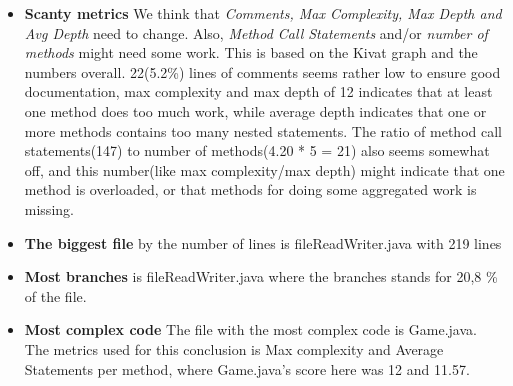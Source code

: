 \documentclass{article}
\begin{document}
\begin{itemize}
\item
\vspace{0.2cm}
	\textbf{Scanty metrics\newline}
 We think that \textit{Comments, Max Complexity, Max Depth and Avg Depth}
need to change. Also, \textit{Method Call Statements} and/or \textit{number of methods} might need some work.
 This is based on the Kivat graph and the numbers overall. 22(5.2\%) lines of comments seems
  rather low to ensure good documentation, max complexity and max depth of 12 indicates that
   at least one method does too much work, while average depth indicates that one or more
    methods contains too many nested statements. The ratio of method call statements(147)
     to number of methods(4.20 * 5 = 21) also seems somewhat off, and this number(like max
      complexity/max depth) might indicate that one method is overloaded, or that methods
       for doing some aggregated work is missing. 

\end{itemize}


\begin{itemize}
 \item
 \textbf{The biggest file} by the number of lines is fileReadWriter.java with 219 lines
\item
  \textbf{Most branches} is fileReadWriter.java where the branches stands for 20,8 \% of the file. 
\item
\textbf{Most complex code}
  The file with the most complex code is Game.java. The metrics used for this conclusion is Max complexity and Average Statements per method, where Game.java's score here was 12 and 11.57.
\end{itemize}
\end{document}
